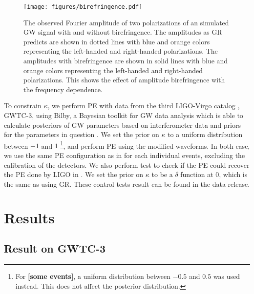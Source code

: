 \documentclass[reprint,amsmath,amssymb,aps,twocolumn]{aastex631}
\begin{document}
\begin{figure}[h]
    \texttt{[image: figures/birefringence.pdf]}
    \caption{
        The observed Fourier amplitude of two polarizations of an simulated GW signal with and without birefringence.
        The amplitudes as GR predicts are shown in dotted lines with blue and orange colors representing the left-handed and right-handed polarizations.
        The amplitudes with birefringence are shown in solid lines with blue and orange colors representing the left-handed and right-handed polarizations.
        This shows the effect of amplitude birefringence with the frequency dependence.
    }
    \label{fig:birefringence}
\end{figure}

To constrain $\kappa$, we perform PE with data from the third LIGO-Virgo catalog \citep{GWTC-2.1, GWTC-3}, GWTC-3, using Bilby,
a Bayesian toolkit for GW data analysis which is able to calculate posteriors of GW parameters based on interferometer data
and priors for the parameters in question \citep{Bilby}. 
We set the prior on $\kappa$ to a uniform distribution between $-1$ and $1$
\footnote{For \textbf{[some events]}, a uniform distribution between $-0.5$ and $0.5$ was used instead. This does not affect the posterior distribution.},
and perform PE using the modified waveforms.
In both case, we use the same PE configuration as in \citet{GWTC-2.1, GWTC-3} for each individual events, excluding the calibration of the detectors.
We also perform test to check if the PE could recover the PE done by LIGO in \citet{GWTC-2.1, GWTC-3}.
We set the prior on $\kappa$ to be a $\delta$ function at $0$, which is the same as using GR.
These control tests result can be found in the data release.

\section{Results}
\label{sec:Results}

\subsection{Result on GWTC-3}




\end{document}
